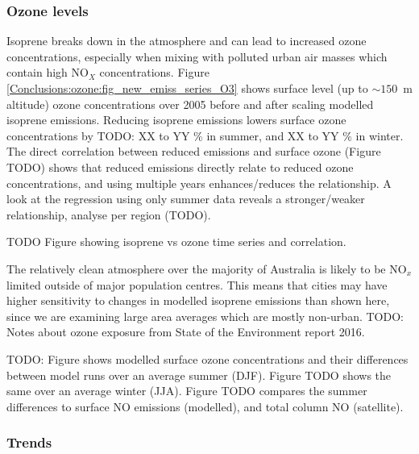     \subsubsection{Ozone levels}
  
      Isoprene breaks down in the atmosphere and can lead to increased ozone concentrations, especially when mixing with polluted urban air masses which contain high NO$_X$ concentrations.
      Figure \ref{Conclusions:ozone:fig_new_emiss_series_O3} shows surface level (up to $\sim 150$~m altitude) ozone concentrations over 2005 before and after scaling modelled isoprene emissions.
      Reducing isoprene emissions lowers surface ozone concentrations by TODO: XX to YY \% in summer, and XX to YY \% in winter.
      The direct correlation between reduced emissions and surface ozone (Figure TODO) shows that reduced emissions directly relate to reduced ozone concentrations, and using multiple years enhances/reduces the relationship.
      A look at the regression using only summer data reveals a stronger/weaker relationship, analyse per region (TODO).
      
      TODO Figure showing isoprene vs ozone time series and correlation.
      
      The relatively clean atmosphere over the majority of Australia is likely to be NO$_x$ limited outside of major population centres.
      This means that cities may have higher sensitivity to changes in modelled isoprene emissions than shown here, since we are examining large area averages which are mostly non-urban.
      TODO: Notes about ozone exposure from State of the Environment report 2016.
      
      
      TODO: Figure shows modelled surface ozone concentrations and their differences between model runs over an average summer (DJF). 
      Figure TODO shows the same over an average winter (JJA).
      Figure TODO compares the summer differences to surface NO emissions (modelled), and total column NO (satellite).
      
    
    \subsubsection{Trends}
    \label{BioIsop:results:new_emiss:trends}
    
